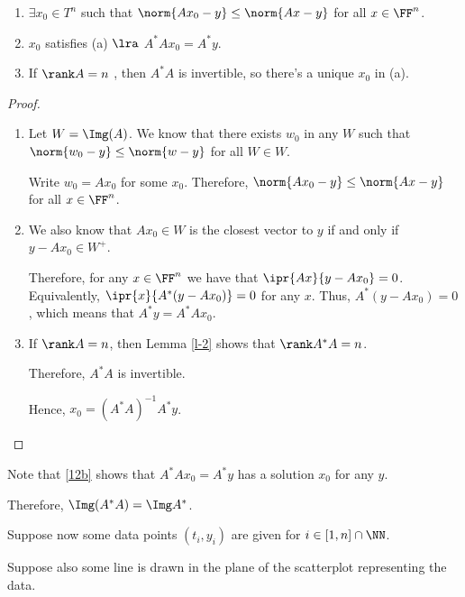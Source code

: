 \documentclass[11pt]{scrartcl}
\begin{document}
\begin{theorem}\hfill
  
  \label{6-12}
  \begin{enumerate}[label=\alph*)]
  \item $\exists x_0\in T^n$ such that $\norm{Ax_0-y}\leq \norm{Ax-y}$ for all $x\in \FF^n$.
  \item $x_0$ satisfies (a) $\lra$ $A^{*}Ax_0 = A^{*}y$.
  \item If $\rank A = n$ , then $A^{*}A$ is invertible, so there's a unique $x_0$ in (a).
  \end{enumerate}
\end{theorem}

\begin{proof}\hfill
  
  \begin{enumerate}[label=\alph*)]
  \item Let $W=\Img(A)$. We know that there exists $w_0$ in any $W$
    such that $\norm{w_0-y}\leq \norm{w-y}$ for all $W\in W$.

    Write $w_0=Ax_0$ for some $x_0$. Therefore,
    $\norm{Ax_0-y}\leq \norm{Ax-y}$ for all $x\in\FF^n$.
    \label{12b}
  \item We also know that $Ax_0\in W$ is the closest vector to $y$ if and only if$y-Ax_0 \in W^{+}$.

    Therefore, for any $x\in\FF^n$ we have that
    $\ipr{Ax}{y-Ax_0}=0$. Equivalently, $\ipr{x}{A^{*}(y-Ax_0)} = 0$
    for any $x$. Thus, $A^{*}(y-Ax_0) =0$, which means that $A^{*}y = A^{*}Ax_0$.
  \item If $\rank A = n$, then Lemma \ref{l-2} shows that $\rank A^{*}A = n$.

    Therefore, $A^{*}A$ is invertible.

    Hence, $x_0 = (A^{*}A)^{-1}A^{*}y$.
    
  \end{enumerate}
\end{proof}

\begin{remark}
  Note that \ref{12b} shows that $A^{*}Ax_0 = A^{*}y$ has a solution $x_0$ for any $y$.

  Therefore, $\Img(A^{*}A) = \Img A^{*}$.
\end{remark}

Suppose now some data points $(t_i, y_i)$ are given for
$i\in [1, n]\cap \NN$.

Suppose also some line is drawn in the plane of the scatterplot
representing the data.
\end{document}
